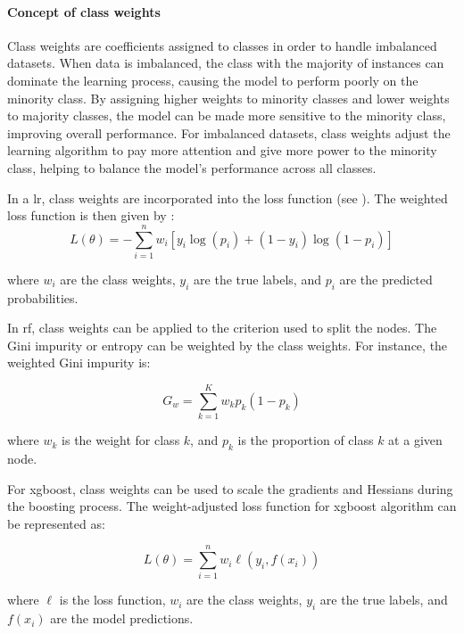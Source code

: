 \documentclass[12pt]{article}
\begin{document}
\paragraph{Concept of class weights}

\noindent Class weights are coefficients assigned to classes in order to handle imbalanced datasets. When data is imbalanced, the class with the majority of instances can dominate the learning process, causing the model to perform poorly on the minority class. By assigning higher weights to minority classes and lower weights to majority classes, the model can be made more sensitive to the minority class, improving overall performance. For imbalanced datasets, class weights adjust the learning algorithm to pay more attention and give more power to the minority class, helping to balance the model's performance across all classes. \hfill \break
 
In a \acrlong{lr}, class weights are incorporated into the loss function (see \cite{AppliedMachineLearning}). The weighted loss function is then given by :
\begin{equation}
L(\theta) = -\sum_{i=1}^{n} w_i \left[ y_i \log(p_i) + (1 - y_i) \log(1 - p_i) \right]
\end{equation}
 
where \( w_i \) are the class weights, \( y_i \) are the true labels, and \( p_i \) are the predicted probabilities. \hfill \break
 
In \acrlong{rf}, class weights can be applied to the criterion used to split the nodes. The Gini impurity or entropy can be weighted by the class weights. For instance, the weighted Gini impurity is:

\begin{equation}
G_w = \sum_{k=1}^{K} w_k p_k (1 - p_k)
\end{equation}
 
where \( w_k \) is the weight for class \( k \), and \( p_k \) is the proportion of class \( k \) at a given node. \hfill \break
 
For \acrshort{xgboost}, class weights can be used to scale the gradients and Hessians during the boosting process. The weight-adjusted loss function for \acrshort{xgboost} algorithm can be represented as:
 
\begin{equation}
L(\theta) = \sum_{i=1}^{n} w_i \ell(y_i, f(x_i))
\end{equation}
 
where \( \ell \) is the loss function, \( w_i \) are the class weights, \( y_i \) are the true labels, and \( f(x_i) \) are the model predictions.
\end{document}
